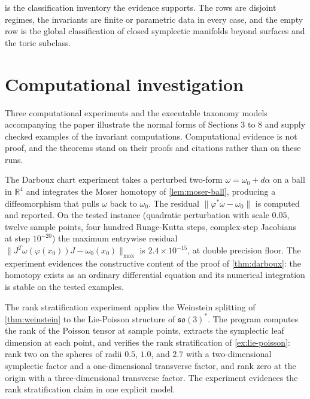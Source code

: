 \documentclass[11pt,letterpaper]{article}
\theoremstyle{definition}
\theoremstyle{remark}
\begin{document}
 is the classification inventory the evidence supports. The rows are disjoint regimes, the invariants are finite or parametric data in every case, and the empty row is the global classification of closed symplectic manifolds beyond surfaces and the toric subclass.

\section{Computational investigation}

Three computational experiments and the executable taxonomy models accompanying the paper illustrate the normal forms of Sections 3 to 8 and supply checked examples of the invariant computations. Computational evidence is not proof, and the theorems stand on their proofs and citations rather than on these runs.

The Darboux chart experiment takes a perturbed two-form $\omega = \omega_0 + d\alpha$ on a ball in $\mathbb{R}^{4}$ and integrates the Moser homotopy of \cref{lem:moser-ball}, producing a diffeomorphism that pulls $\omega$ back to $\omega_0$. The residual $\|\varphi^{*} \omega - \omega_0\|$ is computed and reported. On the tested instance (quadratic perturbation with scale $0.05$, twelve sample points, four hundred Runge-Kutta steps, complex-step Jacobians at step $10^{-20}$) the maximum entrywise residual $\|J^{T} \omega(\varphi(x_0)) J - \omega_0(x_0)\|_{\max}$ is $2.4 \times 10^{-15}$, at double precision floor. The experiment evidences the constructive content of the proof of \cref{thm:darboux}: the homotopy exists as an ordinary differential equation and its numerical integration is stable on the tested examples.

The rank stratification experiment applies the Weinstein splitting of \cref{thm:weinstein} to the Lie-Poisson structure of $\mathfrak{so}(3)^{*}$. The program computes the rank of the Poisson tensor at sample points, extracts the symplectic leaf dimension at each point, and verifies the rank stratification of \cref{ex:lie-poisson}: rank two on the spheres of radii $0.5$, $1.0$, and $2.7$ with a two-dimensional symplectic factor and a one-dimensional transverse factor, and rank zero at the origin with a three-dimensional transverse factor. The experiment evidences the rank stratification claim in one explicit model.
\end{document}
